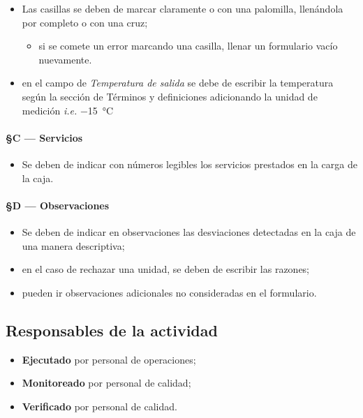 \begin{itemize}
	\item Las casillas se deben de marcar claramente o con una palomilla, llenándola por completo o con una cruz;
	\begin{itemize}
		\item si se comete un error marcando una casilla, llenar un formulario vacío nuevamente.
	\end{itemize}
	\item en el campo de \emph{Temperatura de salida} se debe de escribir la temperatura según la sección de Términos y definiciones adicionando la unidad de medición \emph{i.e.} \SI{-15}{\celsius}
\end{itemize}

\paragraph{§C --- Servicios}

\begin{itemize}
	\item Se deben de indicar con números legibles los servicios prestados en la carga de la caja.
\end{itemize}

\paragraph{§D --- Observaciones}

\begin{itemize}
	\item Se deben de indicar en observaciones las desviaciones detectadas en la caja de una manera descriptiva;
	\item en el caso de rechazar una unidad, se deben de escribir las razones;
	\item pueden ir observaciones adicionales no consideradas en el formulario.
\end{itemize}

\subsection{Responsables de la actividad}

\begin{itemize}
	\item \textbf{Ejecutado} por personal de operaciones;
	\item \textbf{Monitoreado} por personal de calidad;
	\item \textbf{Verificado} por personal de calidad.
\end{itemize}

